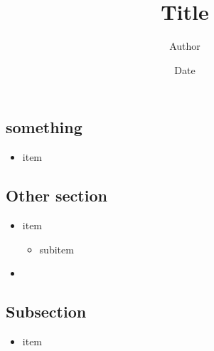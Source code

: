 \documentclass[11pt]{article}
\title{Title}
\author{Author}
\date{Date}
\let\originalitem\item
\renewcommand{\item}{\originalitem[]}
\newcommand{\Newpage}{\end{preview}\begin{preview}}
\begin{document}
\begin{preview}


\maketitle

\Newpage

\section{something}

\begin{itemize}
	\item item
\end{itemize}

\Newpage

\section{Other section}

\begin{itemize}
	\item item
	\begin{itemize}
		\item subitem
	\end{itemize}
	\item 
\end{itemize}

\subsection{Subsection}

\begin{itemize}
	\item item
\end{itemize}

\Newpage

\end{preview}
\end{document}
